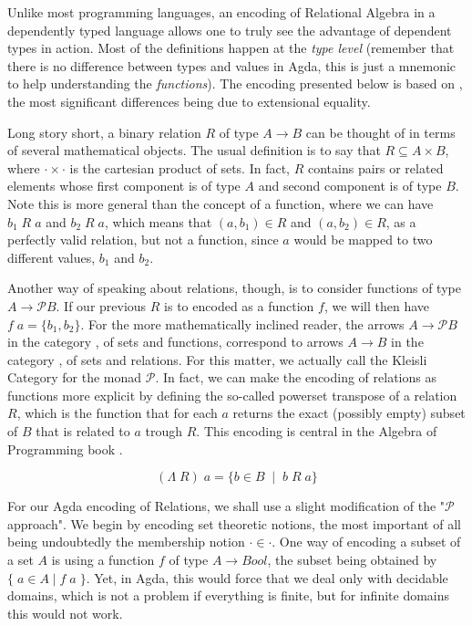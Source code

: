 Unlike most programming languages, an encoding of Relational Algebra in a dependently typed 
language allows one to truly see the advantage of dependent types in action. Most of the definitions
happen at the \emph{type level} (remember that there is no difference between types and values in Agda,
this is just a mnemonic to help understanding the \emph{functions}). The encoding presented
below is based on \cite{Jansson09}, the most significant differences being due to
extensional equality.

Long story short, a binary relation $R$ of type $A \rightarrow B$ can be thought of in terms of several mathematical objects.
The usual definition is to say that $R \subseteq A \times B$, where $\cdot\times\cdot$ is the cartesian product of sets.
In fact, $R$ contains pairs or related elements whose first component is of type $A$ and second component is of type $B$.
Note this is more general than the concept of a function, where we can have $b_1\;R\;a$ and $b_2\;R\;a$, which means
that $(a, b_1) \in R$ and $(a, b_2) \in R$, as a perfectly valid relation, but not a function, since $a$ would be mapped to two different values, $b_1$ and $b_2$.

\newcommand{\powerset}{\mathcal{P}}
Another way of speaking about relations, though, is to consider functions of type $A \rightarrow \powerset B$.
If our previous $R$ is to encoded as a function $f$, we will then have $f\; a = \{b_1, b_2\}$. For the more
mathematically inclined reader, the arrows $A \rightarrow \powerset B$ in the category , of sets and
functions, correspond to arrows $A \rightarrow B$ in the category , of sets and relations. For this matter,
we actually call  the Kleisli Category for the monad $\powerset$. 
In fact, we can make the encoding of relations as functions more explicit
by defining the so-called powerset transpose of a relation $R$, which is the function that for each $a$
returns the exact (possibly empty) subset of $B$ that is related to $a$ trough $R$. This encoding is central
in the Algebra of Programming book \cite{Bird97}.

\[ (\Lambda\; R)\; a = \{ b \in B \;\mid\; b\;R\;a \} \]

For our Agda encoding of Relations, we shall use a slight modification of the "$\powerset$ approach".
We begin by encoding set theoretic notions, the most important of all being undoubtedly
the membership notion $\cdot \in \cdot$. One way of encoding a subset of a set $A$ is using a function $f$
of type $A \rightarrow Bool$, the subset being obtained by $\{\; a \in A\; |\; f\;a\; \}$. Yet, in Agda, this would
force that we deal only with decidable domains, which is not a problem if everything is finite, but
for infinite domains this would not work.

